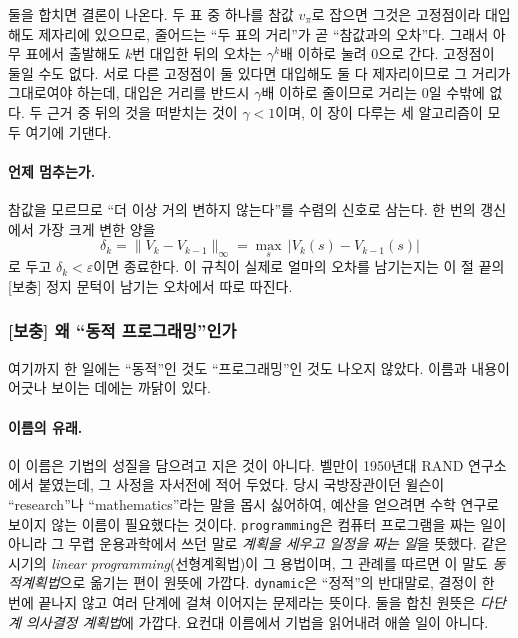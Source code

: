 \documentclass[11pt,a4paper]{article}
\begin{document}
둘을 합치면 결론이 나온다. 두 표 중 하나를 참값 $v_\pi$로 잡으면 그것은 고정점이라 대입해도 제자리에
있으므로, 줄어드는 ``두 표의 거리''가 곧 ``참값과의 오차''다. 그래서 아무 표에서 출발해도 $k$번 대입한
뒤의 오차는 $\gamma^k$배 이하로 눌려 $0$으로 간다. 고정점이 둘일 수도 없다. 서로 다른 고정점이 둘 있다면
대입해도 둘 다 제자리이므로 그 거리가 그대로여야 하는데, 대입은 거리를 반드시 $\gamma$배 이하로 줄이므로
거리는 $0$일 수밖에 없다. 두 근거 중 뒤의 것을 떠받치는 것이 $\gamma<1$이며, 이 장이 다루는 세 알고리즘이
모두 여기에 기댄다.

\paragraph{언제 멈추는가.}
참값을 모르므로 ``더 이상 거의 변하지 않는다''를 수렴의 신호로 삼는다. 한 번의 갱신에서 가장 크게 변한
양을
\begin{equation}
  \delta_k = \bigl\|V_k - V_{k-1}\bigr\|_\infty = \max_{s}\,\bigl|V_k(s)-V_{k-1}(s)\bigr|
  \label{eq:delta}
\end{equation}
로 두고 $\delta_k<\varepsilon$이면 종료한다. 이 규칙이 실제로 얼마의 오차를 남기는지는
이 절 끝의 [보충] 정지 문턱이 남기는 오차에서 따로 따진다.

\subsubsection{[보충] 왜 ``동적 프로그래밍''인가}
\label{sec:whydp}

여기까지 한 일에는 ``동적''인 것도 ``프로그래밍''인 것도 나오지 않았다. 이름과 내용이 어긋나 보이는
데에는 까닭이 있다.

\paragraph{이름의 유래.}
이 이름은 기법의 성질을 담으려고 지은 것이 아니다. 벨만이 1950년대 RAND 연구소에서 붙였는데, 그
사정을 자서전\cite{bellman-auto}에 적어 두었다. 당시 국방장관이던 윌슨이 ``research''나
``mathematics''라는 말을 몹시 싫어하여, 예산을 얻으려면 수학 연구로 보이지 않는 이름이 필요했다는
것이다. \texttt{programming}은 컴퓨터 프로그램을 짜는 일이 아니라 그 무렵 운용과학에서 쓰던 말로
\emph{계획을 세우고 일정을 짜는 일}을 뜻했다. 같은 시기의 \emph{linear programming}(선형계획법)이 그
용법이며, 그 관례를 따르면 이 말도 \emph{동적계획법}으로 옮기는 편이 원뜻에 가깝다.
\texttt{dynamic}은 ``정적''의 반대말로, 결정이 한 번에 끝나지 않고 여러 단계에 걸쳐 이어지는 문제라는
뜻이다. 둘을 합친 원뜻은 \emph{다단계 의사결정 계획법}에 가깝다. 요컨대 이름에서 기법을 읽어내려
애쓸 일이 아니다.
\end{document}
